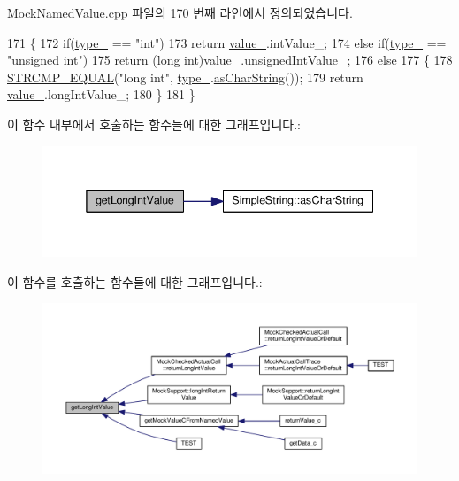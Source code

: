 Mock\+Named\+Value.\+cpp 파일의 170 번째 라인에서 정의되었습니다.


\begin{DoxyCode}
171 \{
172     \textcolor{keywordflow}{if}(\hyperlink{class_mock_named_value_ad41f1c1c681fbfc6ba0ef62ac34ac075}{type\_} == \textcolor{stringliteral}{"int"})
173         \textcolor{keywordflow}{return} \hyperlink{class_mock_named_value_a68986aee29946116b59c6189c19733ac}{value\_}.intValue\_;
174     \textcolor{keywordflow}{else} \textcolor{keywordflow}{if}(\hyperlink{class_mock_named_value_ad41f1c1c681fbfc6ba0ef62ac34ac075}{type\_} == \textcolor{stringliteral}{"unsigned int"})
175         \textcolor{keywordflow}{return} (\textcolor{keywordtype}{long} \textcolor{keywordtype}{int})\hyperlink{class_mock_named_value_a68986aee29946116b59c6189c19733ac}{value\_}.unsignedIntValue\_;
176     \textcolor{keywordflow}{else}
177     \{
178         \hyperlink{_utest_macros_8h_ade1dda09c948fee9ceb853bc6dd5f3cb}{STRCMP\_EQUAL}(\textcolor{stringliteral}{"long int"}, \hyperlink{class_mock_named_value_ad41f1c1c681fbfc6ba0ef62ac34ac075}{type\_}.\hyperlink{class_simple_string_af7c0efaf31f42553f05719903c830be1}{asCharString}());
179         \textcolor{keywordflow}{return} \hyperlink{class_mock_named_value_a68986aee29946116b59c6189c19733ac}{value\_}.longIntValue\_;
180     \}
181 \}
\end{DoxyCode}


이 함수 내부에서 호출하는 함수들에 대한 그래프입니다.\+:
\nopagebreak
\begin{figure}[H]
\begin{center}
\leavevmode
\includegraphics[width=338pt]{class_mock_named_value_a80098b212ec47f46fbea65c4eeca921d_cgraph}
\end{center}
\end{figure}




이 함수를 호출하는 함수들에 대한 그래프입니다.\+:
\nopagebreak
\begin{figure}[H]
\begin{center}
\leavevmode
\includegraphics[width=350pt]{class_mock_named_value_a80098b212ec47f46fbea65c4eeca921d_icgraph}
\end{center}
\end{figure}



